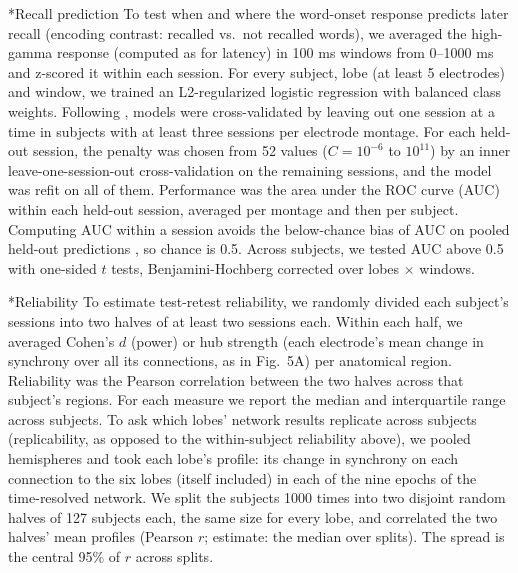 \documentclass[10pt,twocolumn]{article}  %
\makeatletter
\renewcommand\subsection{\@startsection{subsection}{2}{\z@}{-8pt plus -2pt minus -1pt}{2pt}{\raggedright\sffamily\bfseries\normalsize}}
\makeatother
\begin{document}
\subsection*{Recall prediction}\label{recall-prediction}
To test when and where the word-onset response predicts later recall (encoding contrast: recalled vs.\ not recalled words), we averaged the high-gamma response (computed as for latency) in 100 ms windows from 0--1000 ms and z-scored it within each session. For every subject, lobe (at least 5 electrodes) and window, we trained an L2-regularized logistic regression with balanced class weights. Following \citet{DeHaan_2025}, models were cross-validated by leaving out one session at a time in subjects with at least three sessions per electrode montage. For each held-out session, the penalty was chosen from 52 values ($C = 10^{-6}$ to $10^{11}$) by an inner leave-one-session-out cross-validation on the remaining sessions, and the model was refit on all of them. Performance was the area under the ROC curve (AUC) within each held-out session, averaged per montage and then per subject. Computing AUC within a session avoids the below-chance bias of AUC on pooled held-out predictions \citep{Jamalabadi_2016}, so chance is 0.5. Across subjects, we tested AUC above 0.5 with one-sided $t$ tests, Benjamini-Hochberg corrected over lobes $\times$ windows.

\subsection*{Reliability}\label{reliability}
To estimate test-retest reliability, we randomly divided each subject's sessions into two halves of at least two sessions each. Within each half, we averaged Cohen's $d$ (power) or hub strength (each electrode's mean change in synchrony over all its connections, as in Fig.~5A) per anatomical region. Reliability was the Pearson correlation between the two halves across that subject's regions. For each measure we report the median and interquartile range across subjects. To ask which lobes' network results replicate across subjects (replicability, as opposed to the within-subject reliability above), we pooled hemispheres and took each lobe's profile: its change in synchrony on each connection to the six lobes (itself included) in each of the nine epochs of the time-resolved network. We split the subjects 1000 times into two disjoint random halves of 127 subjects each, the same size for every lobe, and correlated the two halves' mean profiles (Pearson $r$; estimate: the median over splits). The spread is the central 95\% of $r$ across splits.
\end{document}
